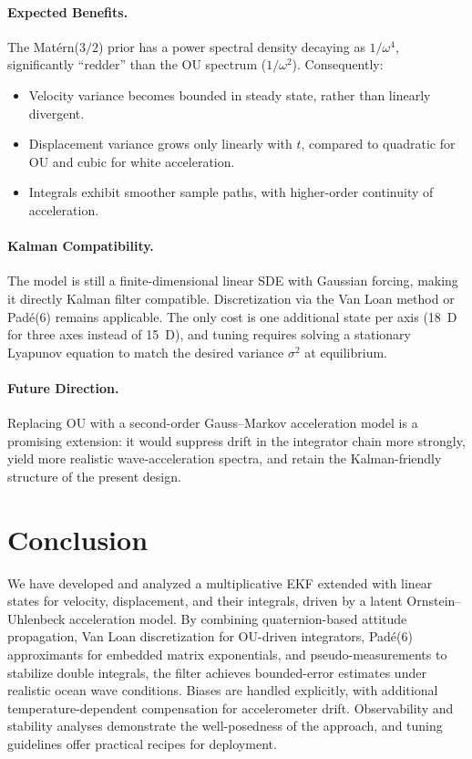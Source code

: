 \documentclass[10pt]{extarticle}
\begin{document}
\paragraph{Expected Benefits.}
The Mat\'ern($3/2$) prior has a power spectral density decaying as $1/\omega^4$,
significantly ``redder'' than the OU spectrum ($1/\omega^2$). Consequently:
\begin{itemize}
\item Velocity variance becomes bounded in steady state, rather than linearly divergent.
\item Displacement variance grows only linearly with $t$, compared to quadratic for OU and cubic for white acceleration.
\item Integrals exhibit smoother sample paths, with higher-order continuity of acceleration.
\end{itemize}

\paragraph{Kalman Compatibility.}
The model is still a finite-dimensional linear SDE with Gaussian forcing, making it
directly Kalman filter compatible. Discretization via the Van Loan method or Pad\'e(6)
remains applicable. The only cost is one additional state per axis (18~D for three axes
instead of 15~D), and tuning requires solving a stationary Lyapunov equation to match
the desired variance $\sigma^2$ at equilibrium.

\paragraph{Future Direction.}
Replacing OU with a second-order Gauss--Markov acceleration model is a promising extension:
it would suppress drift in the integrator chain more strongly, yield more realistic
wave-acceleration spectra, and retain the Kalman-friendly structure of the present design.

\section{Conclusion}
\label{sec:conclusion}

We have developed and analyzed a multiplicative EKF extended with linear
states for velocity, displacement, and their integrals, driven by a latent
Ornstein--Uhlenbeck acceleration model. By combining quaternion-based attitude
propagation, Van Loan discretization for OU-driven integrators, Pad\'e(6)
approximants for embedded matrix exponentials, and pseudo-measurements to
stabilize double integrals, the filter achieves bounded-error estimates under
realistic ocean wave conditions. Biases are handled explicitly, with additional
temperature-dependent compensation for accelerometer drift. Observability and
stability analyses demonstrate the well-posedness of the approach, and tuning
guidelines offer practical recipes for deployment.
\end{document}
